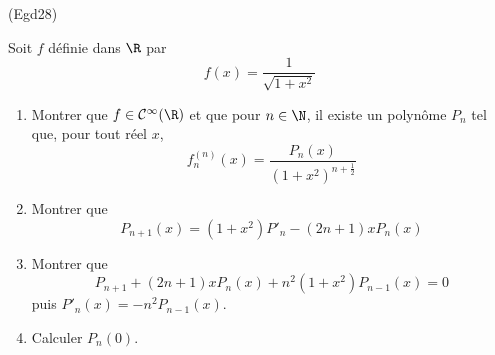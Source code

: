 \begin{tiny}(Egd28)\end{tiny} Soit $f$ définie dans $\R$ par
\begin{displaymath}
 f(x) = \frac{1}{\sqrt{1+x^2}}
\end{displaymath}
\begin{enumerate}
 \item Montrer que $f\in \mathcal{C}^\infty(\R)$ et que pour $n\in \N$, il existe un polynôme $P_n$ tel que, pour tout réel $x$,
\begin{displaymath}
 f_n^{(n)}(x) = \frac{P_n(x)}{(1+x^2)^{n+\frac{1}{2}}}
\end{displaymath}
\item Montrer que
\begin{displaymath}
 P_{n+1}(x) = (1+x^2)P'_n-(2n+1)xP_n(x)
\end{displaymath}
\item Montrer que
\begin{displaymath}
 P_{n+1}+(2n+1)xP_n(x) + n^2(1+x^2)P_{n-1}(x) = 0
\end{displaymath}
puis $P'_n(x) = -n^2P_{n-1}(x)$.
\item Calculer $P_n(0)$.
\end{enumerate}
 